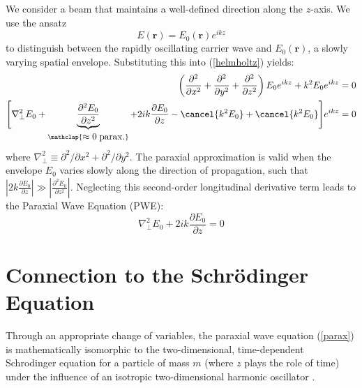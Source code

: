 We consider a beam that maintains a well-defined direction along the $z$-axis. We use the ansatz
\begin{equation}
	E(\mathbf{r}) = E_0(\mathbf{r}) e^{ikz}
\end{equation}
to distinguish between the rapidly oscillating carrier wave and $E_0(\mathbf{r})$, a slowly varying spatial envelope. Substituting this into (\ref{helmholtz}) yields:
\begin{align}
	\left(\frac{\partial^2}{\partial x^2} + \frac{\partial^2}{\partial y^2} + \frac{\partial^2}{\partial z^2}\right)E_0 e^{ikz} + k^2 E_0 e^{ikz} &= 0 \nonumber\\
	\Bigg[\nabla_{\perp}^2 E_0 + \underbrace{\frac{\partial^2 E_0}{\partial z^2}}_{\mathclap{\begin{matrix}\approx 0\;\mathrm{parax.}\end{matrix}}}
	+ 2ik\frac{\partial E_0}{\partial z} - \cancel{k^2 E_0} + \cancel{k^2 E_0} \Bigg] e^{ikz} &= 0
\end{align}
where $\nabla_{\perp}^2 \equiv \partial^2/\partial x^2 + \partial^2/\partial y^2$. The paraxial approximation is valid when the envelope $E_0$ varies slowly along the direction of propagation, such that $\left|2k\frac{\partial E_0}{\partial z}\right| \gg \left|\frac{\partial^2 E_0}{\partial z^2}\right|$. Neglecting this second-order longitudinal derivative term leads to the Paraxial Wave Equation (PWE):
\begin{equation}\label{parax}
	\nabla_{\perp}^2 E_0 + 2ik\frac{\partial E_0}{\partial z} = 0
\end{equation}

\section{Connection to the Schrödinger Equation}

Through an appropriate change of variables, the paraxial wave equation (\ref{parax}) is mathematically isomorphic to the two-dimensional, time-dependent Schrodinger equation for a particle of mass $m$ (where $z$ plays the role of time) under the influence of an isotropic two-dimensional harmonic oscillator \cite{gaussBeam_schrodinger, diss_Strohaber2007}.

